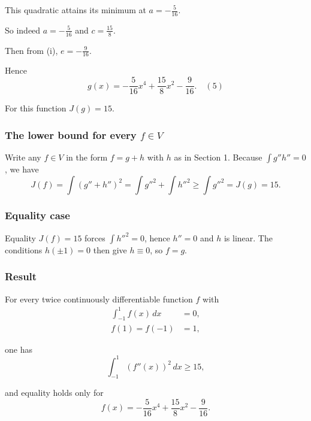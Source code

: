 \documentclass[12pt,a4paper]{article}
\theoremstyle{definition}
\begin{document}
        This quadratic attains its minimum at $a = -\frac{5}{16}$.

        So indeed $a = -\frac{5}{16}$ and $c = \frac{15}{8}$.

        Then from (i), $e = -\frac{9}{16}$.

        Hence
        \begin{equation}
            g(x) = -\frac{5}{16}x^4 + \frac{15}{8}x^2 - \frac{9}{16}. \quad {(5)}
        \end{equation}

        For this function $J(g) = 15$.

        \subsubsection*{The lower bound for every $f \in V$}

        Write any $f \in V$ in the form $f = g + h$ with $h$ as in Section 1.
        Because $\int g''h'' = 0$, we have
        \begin{equation}
            J(f) = \int (g'' + h'')^2 = \int g''^2 + \int h''^2 \geq \int g''^2 = J(g) = 15.
        \end{equation}

        \subsubsection*{Equality case}

        Equality $J(f) = 15$ forces $\int h''^2 = 0$, hence $h'' = 0$ and $h$ is linear.
        The conditions $h(\pm 1) = 0$ then give $h \equiv 0$, so $f = g$.

        \subsubsection*{Result}

        For every twice continuously differentiable function $f$ with
        \begin{align}
            \int_{-1}^{1} f(x) \, dx &= 0, \\
            f(1) = f(-1) &= 1,
        \end{align}

        one has
        \begin{equation}
            \int_{-1}^{1} (f''(x))^2 \, dx \geq 15,
        \end{equation}

        and equality holds only for
        \begin{equation}
            f(x) = -\frac{5}{16}x^4 + \frac{15}{8}x^2 - \frac{9}{16}.
        \end{equation}
\end{document}
